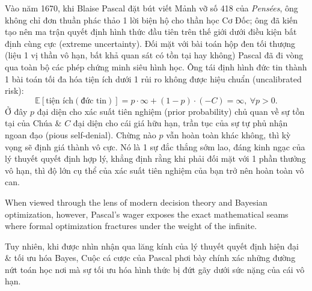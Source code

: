 \documentclass[11pt]{article}
\begin{document}
Vào năm 1670, khi Blaise Pascal đặt bút viết Mảnh vỡ số 418 của \textit{Pens\'ees}, ông không chỉ đơn thuần phác thảo 1 lời biện hộ cho thần học Cơ Đốc; ông đã kiến tạo nên ma trận quyết định hình thức đầu tiên trên thế giới dưới điều kiện bất định cùng cực (extreme uncertainty). Đối mặt với bài toán hộp đen tối thượng (liệu 1 vị thần vô hạn, bất khả quan sát có tồn tại hay không) Pascal đã đi vòng qua toàn bộ các phép chứng minh siêu hình học. Ông tái định hình đức tin thành 1 bài toán tối đa hóa tiện ích dưới 1 rủi ro không được hiệu chuẩn (uncalibrated risk):
\begin{equation*}
	\mathbb{E}[\text{tiện ích}(\text{đức tin})] = p \cdot\infty + (1 - p) \cdot (-C) = \infty,\ \forall p > 0.
\end{equation*}
Ở đây $p$ đại diện cho xác suất tiên nghiệm (prior probability) chủ quan về sự tồn tại của Chúa \& $C$ đại diện cho cái giá hữu hạn, trần tục của sự tự phủ nhận ngoan đạo (pious self-denial). Chừng nào $p$ vẫn hoàn toàn khác không, thì kỳ vọng sẽ định giá thành vô cực. Nó là 1 sự đắc thắng sớm lao, đáng kinh ngạc của lý thuyết quyết định hợp lý, khẳng định rằng khi phải đối mặt với 1 phần thưởng vô hạn, thì độ lớn cụ thể của xác suất tiên nghiệm của bạn trở nên hoàn toàn vô can.

When viewed through the lens of modern decision theory and Bayesian optimization, however, Pascal's wager exposes the exact mathematical seams where formal optimization fractures under the weight of the infinite.

Tuy nhiên, khi được nhìn nhận qua lăng kính của lý thuyết quyết định hiện đại \& tối ưu hóa Bayes, Cuộc cá cược của Pascal phơi bày chính xác những đường nứt toán học nơi mà sự tối ưu hóa hình thức bị đứt gãy dưới sức nặng của cái vô hạn.
\end{document}
